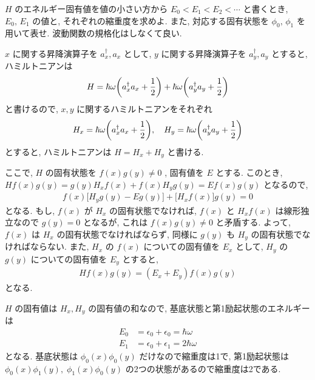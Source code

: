 \documentclass[../../ou-physics-exam.tex]{subfiles}
\begin{document}
$ H $ のエネルギー固有値を値の小さい方から $ E_0 < E_1 < E_2 < \cdots $ と書くとき, $ E_0, \, E_1 $ の値と, それぞれの縮重度を求めよ. 
また, 対応する固有状態を $ \phi_0, \, \phi_1 $ を用いて表せ. 
波動関数の規格化はしなくて良い.
\begin{answer}
    $ x $ に関する昇降演算子を $ a_x^{\dagger}, a_x $ として, $ y $ に関する昇降演算子を $ a_y^{\dagger}, a_y $ とすると, ハミルトニアンは
    \begin{align*}
        H = \hbar \omega \qty(a_x^{\dagger} a_x + \frac{1}{2}) + \hbar \omega \qty(a_y^{\dagger} a_y + \frac{1}{2})
    \end{align*}
    と書けるので, $ x, y $ に関するハミルトニアンをそれぞれ
    \begin{align*}
        H_x = \hbar \omega \qty(a_x^{\dagger} a_x + \frac{1}{2}), \quad H_y = \hbar \omega \qty(a_y^{\dagger} a_y + \frac{1}{2})
    \end{align*}
    とすると, ハミルトニアンは $ H = H_x + H_y $ と書ける.

    ここで, $ H $ の固有状態を $ f(x)g(y) \neq 0 $ , 固有値を $ E $ とする. 
    このとき, $ H f(x)g(y) = g(y) H_x f(x) + f(x) H_y g(y) = E f(x)g(y) $ となるので,
    \begin{align*}
        f(x) \big[H_y g(y) - E g(y) \big] + \big[H_x f(x) \big] g(y) = 0
    \end{align*}
    となる. 
    もし, $ f(x) $ が $ H_x $ の固有状態でなければ, $ f(x) $ と $ H_x f(x) $ は線形独立なので $ g(y) = 0 $ となるが, これは $ f(x)g(y) \neq 0 $ と矛盾する. 
    よって, $ f(x) $ は $ H_x $ の固有状態でなければならず, 同様に $ g(y) $ も $ H_y $ の固有状態でなければならない. 
    また, $ H_x $ の $ f(x) $ についての固有値を $ E_x $ として, $ H_y $ の $ g(y) $ についての固有値を $ E_y $ とすると,
    \begin{align*}
        H f(x)g(y) = (E_x + E_y) f(x)g(y)
    \end{align*}
    となる.

    $ H $ の固有値は $ H_x, H_y $ の固有値の和なので, 基底状態と第1励起状態のエネルギーは
    \begin{align*}
        E_0 & = \epsilon_0 + \epsilon_0 = \hbar \omega \\
        E_1 & = \epsilon_0 + \epsilon_1 = 2 \hbar \omega
    \end{align*}
    となる. 
    基底状態は $ \phi_0 (x) \phi_0 (y) $ だけなので縮重度は1で, 第1励起状態は $ \phi_0 (x) \phi_1 (y), \; \phi_1 (x) \phi_0 (y) $ の2つの状態があるので縮重度は2である.
\end{answer}
\end{document}
